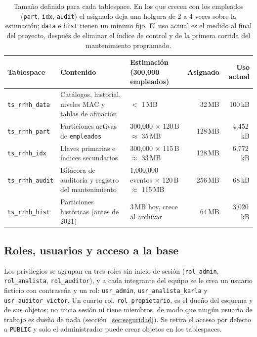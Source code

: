 \documentclass[12pt,a4paper]{article}
\begin{document}
\begin{table}[H]
\centering
\small
\renewcommand{\arraystretch}{1.3}
\setlength{\tabcolsep}{4pt}
\begin{tabular}{lp{}p{}rr}
\toprule
\textbf{Tablespace} & \textbf{Contenido} & \textbf{Estimación (300,000 empleados)} & \textbf{Asignado} & \textbf{Uso actual} \\
\midrule
\texttt{ts\_\allowbreak{}rrhh\_\allowbreak{}data} & Catálogos, historial, niveles MAC y tablas de afinación & $<$ 1\,MB & 32\,MB & 100\,kB \\
\texttt{ts\_\allowbreak{}rrhh\_\allowbreak{}part} & Particiones activas de \texttt{empleados} & 300,000 $\times$ 120\,B $\approx$ 35\,MB & 128\,MB & 4,452\,kB \\
\texttt{ts\_\allowbreak{}rrhh\_\allowbreak{}idx} & Llaves primarias e índices secundarios & 300,000 $\times$ 115\,B $\approx$ 33\,MB & 128\,MB & 6,772\,kB \\
\texttt{ts\_\allowbreak{}rrhh\_\allowbreak{}audit} & Bitácora de auditoría y registro del mantenimiento & 1,000,000 eventos $\times$ 120\,B $\approx$ 115\,MB & 256\,MB & 68\,kB \\
\texttt{ts\_\allowbreak{}rrhh\_\allowbreak{}hist} & Particiones históricas (antes de 2021) & 3\,MB hoy, crece al archivar & 64\,MB & 3,020\,kB \\
\bottomrule
\end{tabular}
\caption{Tamaño definido para cada tablespace. En los que crecen con los empleados (\texttt{part}, \texttt{idx}, \texttt{audit}) el asignado deja una holgura de 2 a 4 veces sobre la estimación; \texttt{data} e \texttt{hist} tienen un mínimo fijo. El uso actual es el medido al final del proyecto, después de eliminar el índice de control y de la primera corrida del mantenimiento programado.}
\label{tab:dimensionamiento}
\end{table}

\subsection{Roles, usuarios y acceso a la base}

Los privilegios se agrupan en tres roles sin inicio de sesión (\texttt{rol\_\allowbreak{}admin}, \texttt{rol\_\allowbreak{}analista}, \texttt{rol\_\allowbreak{}auditor}), y a cada integrante del equipo se le crea un usuario ficticio con contraseña y un rol: \texttt{usr\_\allowbreak{}admin}, \texttt{usr\_\allowbreak{}analista\_\allowbreak{}karla} y \texttt{usr\_\allowbreak{}auditor\_\allowbreak{}victor}. Un cuarto rol, \texttt{rol\_\allowbreak{}propietario}, es el dueño del esquema y de sus objetos; no inicia sesión ni tiene miembros, de modo que ningún usuario de trabajo es dueño de nada (sección~\ref{sec:seguridad}). Se retira el acceso por defecto a \texttt{PUBLIC} y solo el administrador puede crear objetos en los tablespaces.
\end{document}
